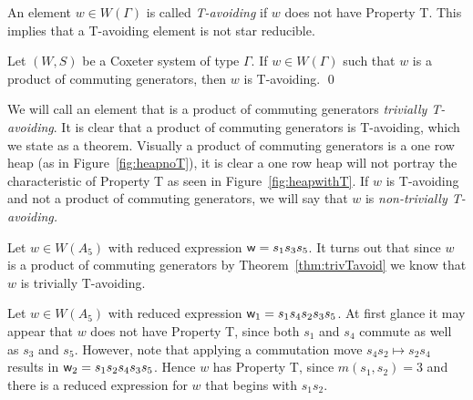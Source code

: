 An element $w \in W(\Gamma)$ is called \emph{T-avoiding} if $w$ does not have Property T. This implies that a T-avoiding element is not star reducible.

\begin{theorem}\label{thm:trivTavoid}
Let $(W,S)$ be a Coxeter system of type $\Gamma$. If $w \in W(\Gamma)$ such that $w$ is a product of commuting generators, then $w$ is T-avoiding. \qed	
\end{theorem}

We will call an element that is a product of commuting generators \emph{trivially T-avoiding}. It is clear that a product of commuting generators is T-avoiding, which we state as a theorem. Visually a product of commuting generators is a one row heap (as in Figure~\ref{fig:heapnoT}), it is clear a one row heap will not portray the characteristic of Property T as seen in Figure~\ref{fig:heapwithT}. If $w$ is T-avoiding and not a product of commuting generators, we will say that $w$ is \emph{non-trivially T-avoiding.} 


\begin{example}\label{ex:tavoid}
Let $w \in W(A_5)$ with reduced expression $\mathsf{w}=s_1s_3s_5$. It turns out that since $w$ is a product of commuting generators by Theorem~\ref{thm:trivTavoid} we know that $w$ is trivially T-avoiding.	
\end{example}

\begin{example}\label{ex:prop-T}
Let $w \in W(A_5)$ with reduced expression $\mathsf{w}_1=s_1s_4s_2s_3s_5$. At first glance it may appear that $w$ does not have Property T, since both $s_1$ and $s_4$ commute as well as $s_3$ and $s_5$. However, note that applying a commutation move $s_4s_2 \mapsto s_2s_4$ results in $\mathsf{w}_2=s_1s_2s_4s_3s_5$. Hence $w$ has Property T, since $m(s_1,s_2)=3$ and there is a reduced expression for $w$ that begins with $s_1s_2$.	
\end{example}



